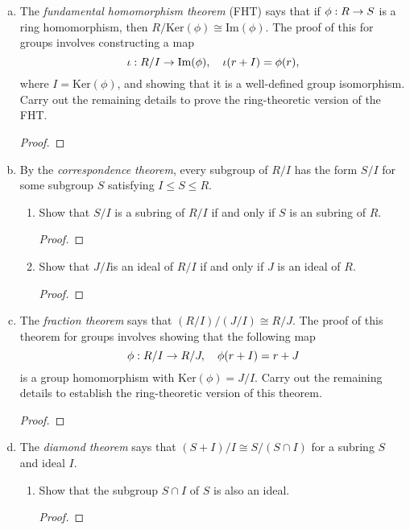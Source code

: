 \begin{itemize}
\begin{enumerate}[(a)]
\begin{proof}
    \end{proof}

    \item The \textit{fundamental homomorphism theorem} (FHT) says that if $\phi : R \rightarrow S$ is a ring homomorphism, then $R/\text{Ker}(\phi) \cong \text{Im}(\phi) $. The proof of this for groups involves constructing a map $$\iota : R/I \rightarrow \text{Im}(\phi), \ \ \  \iota(r + I) = \phi(r),$$ where $I = \text{Ker}(\phi)$, and showing that it is a well-defined group isomorphism. Carry out the remaining details to prove the ring-theoretic version of the FHT.
    \begin{proof}

    \end{proof}

    \item By the \textit{correspondence theorem}, every subgroup of $R/I$ has the form $S/I$ for some subgroup $S$ satisfying $I \leq S \leq R$.
        \begin{enumerate}[i]
          \item Show that $S/I$ is a subring of $R/I$ if and only if $S$ is an subring of $R$.
           \begin{proof}

           \end{proof}

        \item Show that $J/I $is an ideal of $R/I$ if and only if $J$ is an ideal of $R$.
           \begin{proof}

           \end{proof}
        \end{enumerate}
    

    \item The \textit{fraction theorem} says that $(R/I)/(J/I) \cong R/J$. The proof of this theorem for groups involves showing that the following map $$\phi : R/I \rightarrow R/J, \ \ \ \phi(r + I) = r + J$$ is a group homomorphism with $\text{Ker}(\phi) = J/I$. Carry out the remaining details to establish the ring-theoretic version of this theorem.
    \begin{proof}

    \end{proof}

    \item The \textit{diamond theorem} says that $(S + I)/I \cong S/(S \cap I)$ for a subring $S$ and ideal $I$.
    \begin{enumerate}[i]
          \item Show that the subgroup $S \cap I$ of $S$ is also an ideal.
           \begin{proof}


\end{proof}
\end{enumerate}
\end{enumerate}
\end{itemize}
